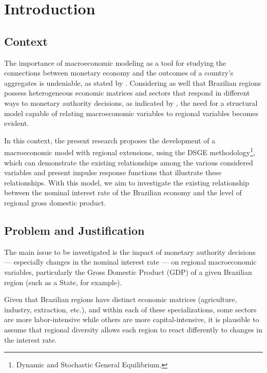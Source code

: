\documentclass[../thesis.tex]{subfiles}
\begin{document}
\newpage

\section{Introduction}\label{sec:introduction}

\subsection*{Context}

The importance of macroeconomic modeling as a tool for studying the connections between monetary economy and the outcomes of a country's aggregates is undeniable, as stated by \textcite{gali_monetary_2015}. Considering as well that Brazilian regions possess heterogeneous economic matrices and sectors that respond in different ways to monetary authority decisions, as indicated by \textcite{bertanha_efeitos_2008}, the need for a structural model capable of relating macroeconomic variables to regional variables becomes evident.

In this context, the present research proposes the development of a macroeconomic model with regional extensions, using the DSGE methodology\footnote{Dynamic and Stochastic General Equilibrium.}, which can demonstrate the existing relationships among the various considered variables and present impulse response functions that illustrate these relationships. With this model, we aim to investigate the existing relationship between the nominal interest rate of the Brazilian economy and the level of regional gross domestic product.

\subsection*{Problem and Justification}

The main issue to be investigated is the impact of monetary authority decisions --- especially changes in the nominal interest rate --- on regional macroeconomic variables, particularly the Gross Domestic Product (GDP) of a given Brazilian region (such as a State, for example).

Given that Brazilian regions have distinct economic matrices (agriculture, industry, extraction, etc.), and within each of these specializations, some sectors are more labor-intensive while others are more capital-intensive, it is plausible to assume that regional diversity allows each region to react differently to changes in the interest rate.
\end{document}

